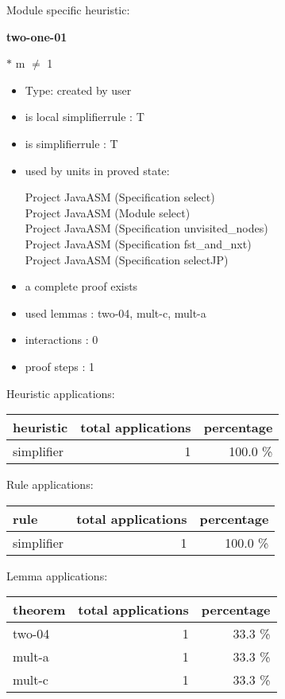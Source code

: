 \documentclass[a4paper]{article}
\begin{document}
Module specific heuristic:

\pagebreak

{\LARGE\bf two-one-01}\label{lemma-two-one-01}

\medskip

  $*$ m $\neq$ 1

\begin{itemize}

\item Type: created by user

\item is local simplifierrule : T
\item is simplifierrule : T
\item used by units in proved state:

Project JavaASM (Specification select) \\
Project JavaASM (Module select) \\
Project JavaASM (Specification unvisited\_nodes) \\
Project JavaASM (Specification fst\_and\_nxt) \\
Project JavaASM (Specification selectJP)
\item       a complete proof exists
\item       used lemmas  : two-04, mult-c, mult-a
\item       interactions : 0
\item       proof steps  : 1
\end{itemize}

\medskip


Heuristic applications:

\begin{supertabular}{l|r|r}
heuristic	& total applications & percentage \\ \hline
simplifier & 1 & 100.0 \% \\

\end{supertabular}

Rule applications:

\begin{supertabular}{l|r|r}
rule	        & total applications & percentage \\ \hline
simplifier & 1 & 100.0 \% \\

\end{supertabular}

Lemma applications:

\begin{supertabular}{l|r|r}
theorem	        & total applications & percentage \\ \hline
two-04 & 1 & 33.3 \% \\
mult-a & 1 & 33.3 \% \\
mult-c & 1 & 33.3 \% \\

\end{supertabular}
\end{document}
